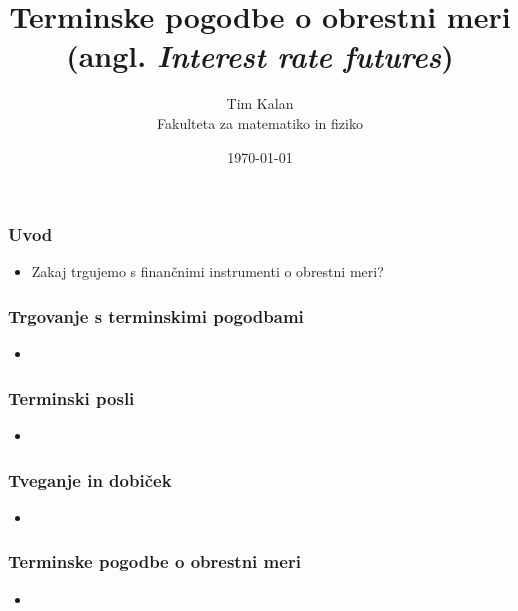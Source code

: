 \documentclass[14pt]{beamer}
\author{Tim Kalan \\ Fakulteta za matematiko in fiziko}
\title{
    Terminske pogodbe o obrestni meri \\ 
    \large (angl. \textit{Interest rate futures})}
\date{\today}
\begin{document}
\begin{frame}
    \titlepage
\end{frame}

\begin{frame}
    \frametitle{Uvod}

    \begin{itemize}
        \item Zakaj trgujemo s finančnimi instrumenti o obrestni meri?
    \end{itemize}


\end{frame}

\begin{frame}
    \frametitle{Trgovanje s terminskimi pogodbami}
    
    \begin{itemize}
        \item
    \end{itemize}

\end{frame}

\begin{frame}
    \frametitle{Terminski posli}
    
    \begin{itemize}
        \item
    \end{itemize}

\end{frame}

\begin{frame}
    \frametitle{Tveganje in dobiček}
    
    \begin{itemize}
        \item
    \end{itemize}

\end{frame}

\begin{frame}
    \frametitle{Terminske pogodbe o obrestni meri}
    
    \begin{itemize}
        \item
    \end{itemize}

\end{frame}
\end{document}
